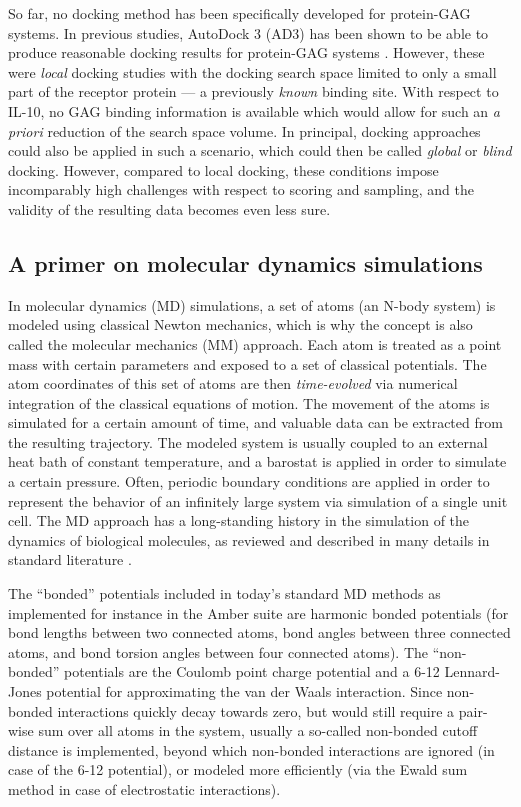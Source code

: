 So far, no docking method has been specifically developed for protein-GAG
systems. In previous studies, AutoDock 3 (AD3) \cite{Morris1998} has been shown
to be able to produce reasonable docking results for protein-GAG systems
\cite{japan_docking_ad3_clustering, samsonov_docking_2011}. However, these were
\textit{local} docking studies with the docking search space limited to only a
small part of the receptor protein --- a previously \textit{known} binding site.
With respect to IL-10, no GAG binding information is available which would allow
for such an \textit{a priori} reduction of the search space volume. In
principal, docking approaches could also be applied in such a scenario, which
could then be called \textit{global} or \textit{blind} docking. However,
compared to local docking, these conditions impose incomparably high challenges
with respect to scoring and sampling, and the validity of the resulting data
becomes even less sure.

\subsection{A primer on molecular dynamics simulations}

In molecular dynamics (MD) simulations, a set of atoms (an N-body system) is
modeled using classical Newton mechanics, which is why the concept is also
called the molecular mechanics (MM) approach. Each atom is treated as a point
mass with certain parameters and exposed to a set of classical potentials. The
atom coordinates of this set of atoms are then \textit{time-evolved} via
numerical integration of the classical equations of motion. The movement of the
atoms is simulated for a certain amount of time, and valuable data can be
extracted from the resulting trajectory. The modeled system is usually coupled
to an external heat bath of constant temperature, and a barostat is applied in
order to simulate a certain pressure. Often, periodic boundary conditions are
applied in order to represent the behavior of an infinitely large system via
simulation of a single unit cell. The MD approach has a long-standing history in
the simulation of the dynamics of biological molecules, as reviewed and
described in many details in standard literature
\cite{mccammon1988dynamics}.

The \enquote{bonded} potentials included in today's standard MD methods as
implemented for instance in the Amber suite \cite{original_amber_1981,
amber_overview_2013} are harmonic bonded potentials (for bond lengths between
two connected atoms, bond angles between three connected atoms, and bond torsion
angles between four connected atoms). The \enquote{non-bonded} potentials are
the Coulomb point charge potential and a 6-12 Lennard-Jones potential for
approximating the van der Waals interaction. Since non-bonded interactions
quickly decay towards zero, but would still require a pair-wise sum over all
atoms in the system, usually a so-called non-bonded cutoff distance is
implemented, beyond which non-bonded interactions are ignored (in case of the
6-12 potential), or modeled more efficiently (via the Ewald sum method in case
of electrostatic interactions).

